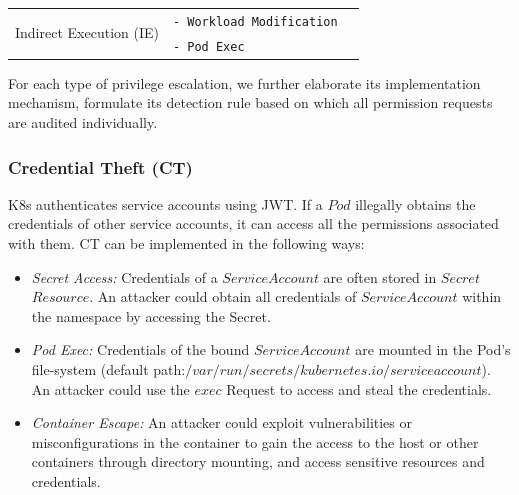 \documentclass[conference]{IEEEtran}
\theoremstyle{definition}
\begin{document}
\begin{table}[!ht]
\begin{tabular}{m{3cm}m{4cm}>{\raggedright\arraybackslash}p{9.5cm}}
    \multirow[t]{2}{2.5cm}{Indirect Execution \quad  (IE) }
    & \texttt{- Workload Modification} 
    & \multirow{2}{9cm}{
        \vspace{-4.1ex}
       \begin{equation*}
        \label{equ:ie}
        PR_{IE} = \left\{PR \, \middle| \, 
        \begin{aligned}
            & (PR.Resource \in WL \land Pr.Operation \in \{ \text{create} \\
            & \quad \text{patch, update} \}) \vee PR \in (*,*,*, \text{exec}, \text{Pod})
        \end{aligned}
        \right\} \quad\quad\quad\quad
    \end{equation*}
        } \\
    & \texttt{-  Pod Exec} \\
    \bottomrule
    \end{tabular}
\end{table}

For each type of privilege escalation, we further elaborate its implementation mechanism, formulate its detection rule based on which all permission requests are audited individually. 

\subsubsection{Credential Theft (CT)}
K8s authenticates service accounts using JWT. If a $Pod$ illegally obtains the credentials of other service accounts, it can access all the permissions associated with them. CT can be implemented in the following ways:
\begin{itemize}
  \item \textit{Secret Access:} Credentials of a $ServiceAccount$ are often stored in $Secret$ $Resource$. An attacker could obtain all credentials of $ServiceAccount$ within the namespace by accessing the Secret.
  \item \textit{Pod Exec:} Credentials of the bound $ServiceAccount$ are mounted in the Pod's file-system (default path:$/var/run/secrets/kubernetes.io/serviceaccount$). An attacker could use the $exec$ Request to access and steal the credentials.
  \item \textit{Container Escape:} An attacker could exploit vulnerabilities or misconfigurations in the container to gain the access to the host or other containers through directory mounting, and access sensitive resources and credentials.
\end{itemize}
\end{document}
